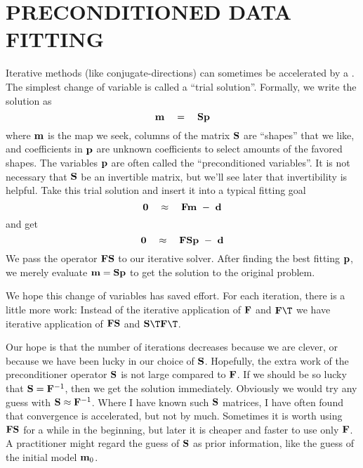 \section{PRECONDITIONED DATA FITTING}
\par
Iterative methods (like conjugate-directions) can sometimes be accelerated
by a .
The simplest change of variable is called a ``trial solution''.
Formally, we write the solution as
\begin{equation}
\bold m \quad =\quad \bold S \bold p
\end{equation}
where $\bold m$ is the map we seek,
columns of the matrix $\bold S$ are ``shapes'' that we like,
and coefficients in $\bold p$ are unknown coefficients
to select amounts of the favored shapes.
The variables $\bold p$  are often called the ``preconditioned variables''.
It is not necessary that $\bold S$ be an invertible matrix,
but we'll see later that invertibility is helpful.
Take this trial solution and insert it into
a typical fitting goal
\begin{equation}
\bold 0 \quad\approx\quad  \bold F \bold m \ -\  \bold d
\end{equation}
and get
\begin{equation}
\bold 0 \quad\approx\quad  \bold F \bold S \bold p \ -\  \bold d
\end{equation}
We pass the operator $\bold F \bold S$ to our iterative solver.
After finding the best fitting                                      $\bold p$,
we merely evaluate
                                                $ \bold m = \bold S \bold p$
to get the solution to the original problem.

\par
We hope this change of variables has saved effort.
For each iteration, there is a little more work:
Instead of the iterative application of
                                                $\bold F$ and $\bold F\T$
we have iterative application of
                                        $\bold F\bold S$ and $\bold S\T\bold F\T$.

Our hope is that the number of iterations decreases because we are clever,
or because we have been lucky in our choice of $\bold S$.
Hopefully,
the extra work of the preconditioner operator $\bold S$
is not large compared to $\bold F$.
If we should be so lucky that
$\bold S= \bold F^{-1}$,
then we get the solution immediately.
Obviously we would try any guess with
$\bold S\approx \bold F^{-1}$.
Where I have known such $\bold S$ matrices,
I have often found that convergence is accelerated,
but not by much.
Sometimes it is worth using $\bold F\bold S$ for a while in the beginning,
but later it is cheaper and faster to use only $\bold F$.
A practitioner might regard the guess of $\bold S$
as prior information,
like the guess of the initial model $\bold m_0$.

